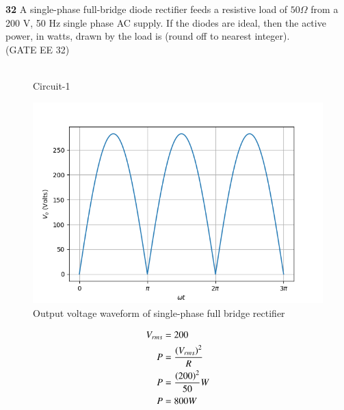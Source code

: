 \documentclass[journal,12pt,twocolumn]{IEEEtran}
\begin{document}


\vspace{3cm}

\title{}
\author{EE23BTECH11047 - Deepakreddy P
}
\maketitle
\newpage
\bigskip

\noindent \textbf{32} \quad A single-phase full-bridge diode rectifier feeds a resistive load of $50 \Omega$ from a 200 V,
50 Hz single phase AC supply. If the diodes are ideal, then the active power, in watts,
drawn by the load is  (round off to nearest integer).  \\
\hfill (GATE EE 32)\\
\solution\\

\begin{figure}[ht]
  \centering
  \begin{adjustbox}{width=0.8\columnwidth}
      
  \end{adjustbox}
  \caption{Circuit-1}
\end{figure}

\begin{figure}[ht]
   \centering
   \includegraphics[width=1.2\columnwidth]{figs/gt1.png}
   \caption{Output voltage waveform of single-phase full
bridge rectifier}
\end{figure}


\begin{center}
    \begin{table}[ht]
        
    \end{table}
\end{center}

\begin{align}
    V_{rms} &= 200\\
    P &= \frac{\left(V_{rms}\right)^2}{R}\\
    P &= \frac{\left(200\right)^2}{50}W\\
    P &= 800W
\end{align}
\end{document}
